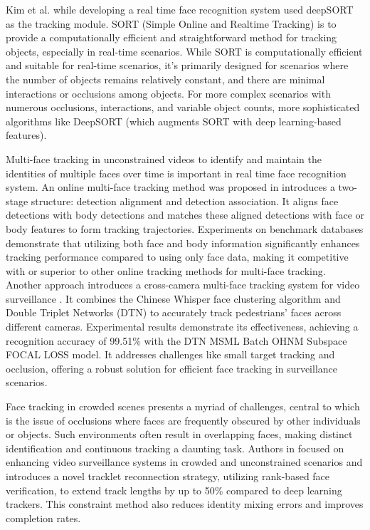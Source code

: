 Kim et al. \cite{kim_facial_2023} while developing a real time face recognition system used deepSORT as the tracking module. SORT (Simple Online and Realtime Tracking) is to provide a computationally efficient and straightforward method for tracking objects, especially in real-time scenarios. While SORT is computationally efficient and suitable for real-time scenarios, it's primarily designed for scenarios where the number of objects remains relatively constant, and there are minimal interactions or occlusions among objects. For more complex scenarios with numerous occlusions, interactions, and variable object counts, more sophisticated algorithms like DeepSORT (which augments SORT with deep learning-based features).

Multi-face tracking in unconstrained videos to identify and maintain the identities of multiple faces over time is important in real time face recognition system. An online multi-face tracking method was proposed in \cite{weng_online_2023} introduces a two-stage structure: detection alignment and detection association. It aligns face detections with body detections and matches these aligned detections with face or body features to form tracking trajectories. Experiments on benchmark databases demonstrate that utilizing both face and body information significantly enhances tracking performance compared to using only face data, making it competitive with or superior to other online tracking methods for multi-face tracking. Another approach introduces a cross-camera multi-face tracking system for video surveillance \cite{ren_cross-camera_2021}. It combines the Chinese Whisper face clustering algorithm and Double Triplet Networks (DTN) to accurately track pedestrians' faces across different cameras. Experimental results demonstrate its effectiveness, achieving a recognition accuracy of 99.51\% with the DTN MSML Batch OHNM Subspace FOCAL LOSS model. It addresses challenges like small target tracking and occlusion, offering a robust solution for efficient face tracking in surveillance scenarios.

Face tracking in crowded scenes presents a myriad of challenges, central to which is the issue of occlusions where faces are frequently obscured by other individuals or objects. Such environments often result in overlapping faces, making distinct identification and continuous tracking a daunting task. Authors in \cite{barquero_rank-based_2021} focused on enhancing video surveillance systems in crowded and unconstrained scenarios and introduces a novel tracklet reconnection strategy, utilizing rank-based face verification, to extend track lengths by up to 50\% compared to deep learning trackers. This constraint method also reduces identity mixing errors and improves completion rates.

